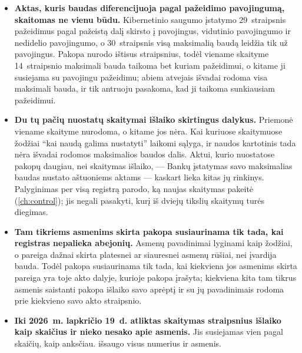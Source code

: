 \begin{itemize}
    įstatymas baudas nustato už tai, ką išvardija MiCA 111~straipsnio 1~dalies b ir c~punktai,
    Asmens duomenų teisinės apsaugos įstatymas --- už tai, ką išvardija BDAR 83~straipsnio 4 ir
    5~dalys: kartu su sankcijų nuostatomis pateikiamas tik skaitomo akto straipsnis. Tokia
    pakopa nurodo straipsnį, kuriame yra sąrašas, ir nepasiekia jokios išvados; išvadai rodoma
    paties reglamento maksimali bauda.
  \item \textbf{Aktas, kuris baudas diferencijuoja pagal pažeidimo pavojingumą, skaitomas ne
    vienu būdu.} Kibernetinio saugumo įstatymo 29~straipsnis pažeidimus pagal pažeistą dalį
    skirsto į pavojingus, vidutinio pavojingumo ir nedidelio pavojingumo, o 30~straipsnis visą
    maksimalią baudą leidžia tik už pavojingus. Pakopa nurodo ištisus straipsnius, todėl
    viename skaityme 14~straipsnio maksimali bauda taikoma bet kuriam pažeidimui, o kitame ji
    susiejama su pavojingu pažeidimu; abiem atvejais išvadai rodoma visa maksimali bauda, ir
    tik antruoju pasakoma, kad ji taikoma sunkiausiam pažeidimui.
  \item \textbf{Du tų pačių nuostatų skaitymai išlaiko skirtingus dalykus.} Priemonė viename
    skaityme nurodoma, o kitame jos nėra. Kai kuriuose skaitymuose žodžiai \enquote{kai naudą
    galima nustatyti} laikomi sąlyga, ir naudos kartotinis tada nėra išvadai rodomos
    maksimalios baudos dalis. Aktui, kurio nuostatose pakopų daugiau, nei skaitymas išlaiko,
    --- Bankų įstatymas savo maksimalias baudas nustato aštuoniems aktams --- kaskart lieka
    kitas jų rinkinys. Palyginimas per visą registrą parodo, ką naujas skaitymas pakeitė
    (\cref{ch:control}); jis negali pasakyti, kurį iš dviejų tikslių skaitymų turės diegimas.
  \item \textbf{Tam tikriems asmenims skirta pakopa susiaurinama tik tada, kai registras
    nepalieka abejonių.} Asmenų pavadinimai lyginami kaip žodžiai, o pareiga dažnai skirta
    platesnei ar siauresnei asmenų rūšiai, nei įvardija bauda. Todėl pakopa susiaurinama tik
    tada, kai kiekviena jos asmenims skirta pareiga yra toje akto dalyje, kurioje pakopa
    įrašyta; kiekviena kita tam tikrus asmenis saistanti pakopa išlaiko savo aprėptį ir su jų
    pavadinimais rodoma prie kiekvieno savo akto straipsnio.
  \item \textbf{Iki 2026~m. lapkričio 19~d. atliktas skaitymas straipsnius išlaiko kaip
    skaičius ir nieko nesako apie asmenis.} Jis susiejamas vien pagal skaičių, kaip anksčiau.
     išsaugo visus numerius ir asmenis.

\end{itemize}
